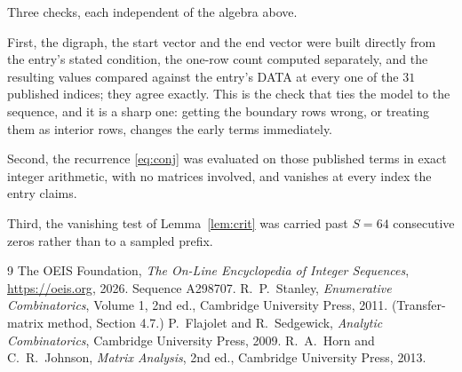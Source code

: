 \documentclass[11pt,a4paper]{article}
\theoremstyle{plain}
\theoremstyle{definition}
\begin{document}
Three checks, each independent of the algebra above.

First, the digraph, the start vector and the end vector were built directly from the
entry's stated condition, the one-row count computed separately, and the resulting values
compared against the entry's DATA at every one of the $31$ published indices; they
agree exactly. This is the check that ties the model to the sequence, and it is a sharp one:
getting the boundary rows wrong, or treating them as interior rows, changes the early terms
immediately.

Second, the recurrence \eqref{eq:conj} was evaluated on those published terms in exact
integer arithmetic, with no matrices involved, and vanishes at every index the entry claims.

Third, the vanishing test of Lemma~\ref{lem:crit} was carried past $S=64$ consecutive
zeros rather than to a sampled prefix.

\begin{thebibliography}{9}
 The OEIS Foundation, \emph{The On-Line Encyclopedia of Integer
Sequences}, \url{https://oeis.org}, 2026. Sequence A298707.
 R.~P.~Stanley, \emph{Enumerative Combinatorics}, Volume 1, 2nd ed.,
Cambridge University Press, 2011. (Transfer-matrix method, Section 4.7.)
 P.~Flajolet and R.~Sedgewick, \emph{Analytic Combinatorics}, Cambridge
University Press, 2009.
 R.~A.~Horn and C.~R.~Johnson, \emph{Matrix Analysis}, 2nd ed., Cambridge
University Press, 2013.
\end{thebibliography}
\end{document}
